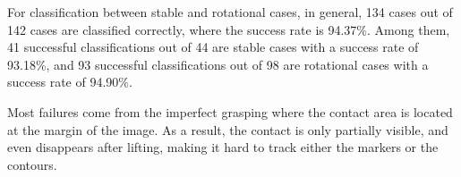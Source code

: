 
For classification between stable and rotational cases, 
in general, 134 cases out of 142 cases are classified correctly, where the success rate is 94.37\%. Among them, 41 successful classifications out of 44 are stable cases with a success rate of 93.18\%, and 93 successful classifications out of 98 are rotational cases with a success rate of 94.90\%.

Most failures come from the imperfect grasping where the contact area is located at the margin of the image. As a result, the contact is only partially visible, and even disappears after lifting, making it hard to track either the markers or the contours.

